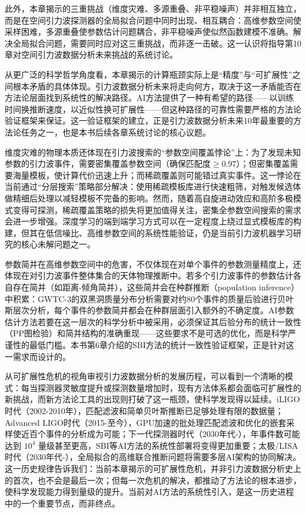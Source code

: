 此外，本章揭示的三重挑战（维度灾难、多源重叠、非平稳噪声）并非相互独立，而是在空间引力波探测器的全局拟合问题中同时出现、相互耦合：高维参数空间使采样困难，多源重叠使参数估计问题耦合，非平稳噪声使似然函数建模不准确。解决全局拟合问题，需要同时应对这三重挑战，而非逐一击破。这一认识将指导第10章对空间引力波数据分析未来挑战的系统讨论。

从更广泛的科学哲学角度看，本章揭示的计算瓶颈实际上是“精度”与“可扩展性”之间根本矛盾的具体体现。引力波数据分析未来将走向何方，取决于这一矛盾能否在方法论层面找到系统性的解决路径。AI方法提供了一种有希望的路径——以训练时间换推断速度，以近似性换可扩展性——但这种路径的可靠性需要严格的方法论验证框架来保证。这一验证框架的建立，正是引力波数据分析未来10年最重要的方法论任务之一，也是本书后续各章系统讨论的核心议题。

维度灾难的物理本质还体现在引力波搜索的“参数空间覆盖悖论”上：为了发现未知参数的引力波事件，需要密集覆盖参数空间（确保匹配度$\geq 0.97$）；但密集覆盖需要海量模板，使计算代价迅速上升；而稀疏覆盖则可能错过真实事件。这一悖论在当前通过“分层搜索”策略部分解决：使用稀疏模板库进行快速粗筛，对触发候选体做精细后处理以减轻模板不完备的影响。然而，随着高自旋进动效应和高阶多极模式变得可探测，稀疏覆盖策略的损失将更加值得关注，密集全参数空间搜索的需求会进一步增强。深度学习的端到端学习方式可以在一定程度上绕过显式模板库的构建，但其在低信噪比、高维参数空间的系统性能验证，仍是当前引力波机器学习研究的核心未解问题之一。

参数简并在高维参数空间中的危害，不仅体现在对单个事件的参数测量精度上，还体现在对引力波事件整体集合的天体物理推断中。若多个引力波事件的参数估计各自存在简并（如距离-倾角简并），这些简并会在种群推断（population inference）中积累：GWTC-3的双黑洞质量分布分析需要对约80个事件的质量后验进行贝叶斯层次分析，每个事件的参数简并都会在种群层面引入额外的不确定度。AI参数估计方法若要在这一层次的科学分析中被采用，必须保证其后验分布的统计一致性（PP图检验）和简并结构的准确重现——这些要求不是可选的优化，而是科学严谨性的最低门槛。本书第6章介绍的SBI方法的统计一致性验证框架，正是针对这一需求而设计的。

从可扩展性危机的视角审视引力波数据分析的发展历程，可以看到一个清晰的模式：每当探测器灵敏度提升或探测数量增加时，现有方法体系都会面临可扩展性的新挑战，而新方法论工具的出现则打破了这一瓶颈，使科学发现得以延续。iLIGO时代（2002-2010年），匹配滤波和简单贝叶斯推断已足够处理有限的数据量；Advanced LIGO时代（2015-至今），GPU加速的批处理匹配滤波和优化的嵌套采样使近百个事件的分析成为可能；下一代探测器时代（2030年代-），年事件数可能达到 $10^4$ 量级甚至更高，SBI等AI方法的系统性部署将变得更加重要；太极/LISA时代（2030年代-），全局拟合的高维联合推断问题将需要多层AI架构的协同解决。这一历史规律告诉我们：当前本章揭示的可扩展性危机，并非引力波数据分析史上的首次，也不会是最后一次；但每一次危机的解决，都推动了方法论的根本进步，使科学发现能力得到量级的提升。当前对AI方法的系统性引入，是这一历史进程中的一个重要节点，而非终点。

